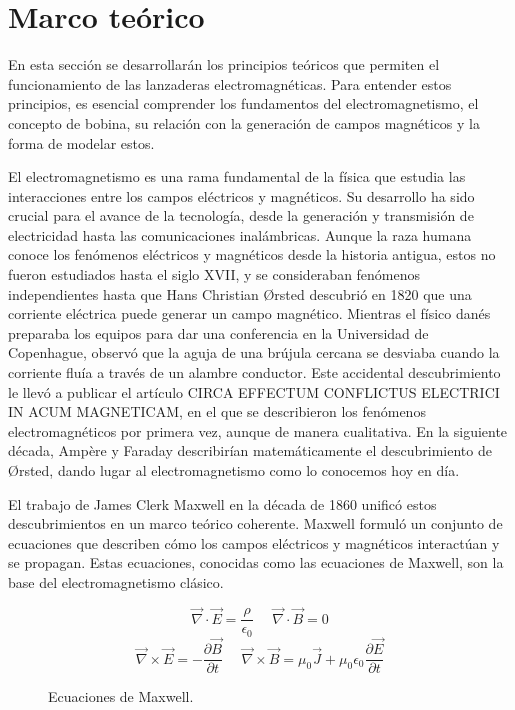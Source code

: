 \section{Marco teórico}
\label{sec:marcoteorico}

En esta sección se desarrollarán los principios teóricos que permiten el funcionamiento de las lanzaderas electromagnéticas. Para entender estos principios, es esencial comprender los fundamentos del electromagnetismo, el concepto de bobina, su relación con la generación de campos magnéticos y la forma de modelar estos.

El electromagnetismo es una rama fundamental de la física que estudia las interacciones entre los campos eléctricos y magnéticos. Su desarrollo ha sido crucial para el avance de la tecnología, desde la generación y transmisión de electricidad hasta las comunicaciones inalámbricas. Aunque la raza humana conoce los fenómenos eléctricos y magnéticos desde la historia antigua, estos no fueron estudiados hasta el siglo XVII, y se consideraban fenómenos independientes hasta que Hans Christian Ørsted descubrió en 1820 que una corriente eléctrica puede generar un campo magnético. Mientras el físico danés preparaba los equipos para dar una conferencia en la Universidad de Copenhague, observó que la aguja de una brújula cercana se desviaba cuando la corriente fluía a través de un alambre conductor. Este accidental descubrimiento le llevó a publicar el artículo CIRCA EFFECTUM CONFLICTUS ELECTRICI IN ACUM MAGNETICAM, en el que se describieron los fenómenos electromagnéticos por primera vez, aunque de manera cualitativa. En la siguiente década, Ampère y Faraday describirían matemáticamente el descubrimiento de Ørsted, dando lugar al electromagnetismo como lo conocemos hoy en día\citep{oersted2024}.

El trabajo de James Clerk Maxwell en la década de 1860 unificó estos descubrimientos en un marco teórico coherente. Maxwell formuló un conjunto de ecuaciones que describen cómo los campos eléctricos y magnéticos interactúan y se propagan. Estas ecuaciones, conocidas como las ecuaciones de Maxwell, son la base del electromagnetismo clásico.

\begin{figure}[H]
    \centering
    \[
    \vec{\nabla}\cdot \vec{E}= \frac{\rho}{\epsilon_0}~~~~~~\vec{\nabla}\cdot \vec{B}= 0
    \]
    \[
    \vec{\nabla}\times\vec{E}=-\frac{\partial\vec{B}}{\partial t}~~~~~~\vec{\nabla}\times \vec{B}=\mu_0\vec{J}+\mu_0\epsilon_0\frac{\partial \vec{E}}{\partial t}
    \]
    \caption{Ecuaciones de Maxwell\citep{purcell2013electricidad}.}
    \label{fig:maxwell_equations}
\end{figure}

